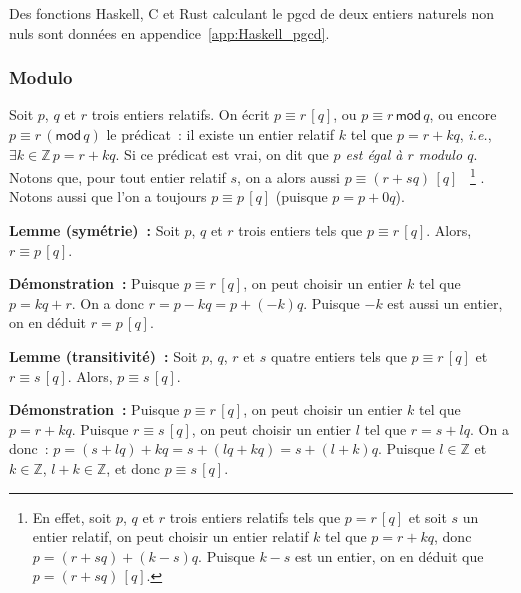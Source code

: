    \done 

\medskip

Des fonctions Haskell, C et Rust calculant le pgcd de deux entiers naturels non nuls sont données en appendice~\ref{app:Haskell_pgcd}. 

\subsubsection{Modulo}

Soit $p$, $q$ et $r$ trois entiers relatifs. 
On écrit $p \equiv r \, [q]$, ou $p \equiv r \, \mathsf{mod} \, q$, ou encore $p \equiv r \, ( \mathsf{mod} \, q)$ le prédicat : il existe un entier relatif $k$ tel que $p = r + k q$, \textit{i.e.}, $\exists k \in \mathbb{Z} \, p = r + k q$. 
Si ce prédicat est vrai, on dit que \textit{$p$ est égal à $r$ modulo $q$}.
Notons que, pour tout entier relatif $s$, on a alors aussi $p \equiv (r + s q) \, [q]$%
~\footnote{
    En effet, soit $p$, $q$ et $r$ trois entiers relatifs tels que $p = r \, [q]$ et soit $s$ un entier relatif, on peut choisir un entier relatif $k$ tel que $p = r + k q$, donc $p = (r + s q) + (k - s) q$. 
    Puisque $k-s$ est un entier, on en déduit que $p = (r + s q) \, [q]$.
}%
.
Notons aussi que l'on a toujours $p \equiv p \, [q]$ (puisque $p = p + 0 q$). 
 \sindex[isy]{$\%$}

\medskip 

\noindent\textbf{Lemme (symétrie) :} Soit $p$, $q$ et $r$ trois entiers tels que $p \equiv r \, [q]$.
    Alors, $r \equiv p \, [q]$.

\medskip 
    
\noindent\textbf{Démonstration :} 
    Puisque $p \equiv r \, [q]$, on peut choisir un entier $k$ tel que $p = k q + r$.
    On a donc $r = p - k q = p + (-k) q$. 
    Puisque $-k$ est aussi un entier, on en déduit $r = p \, [q]$.

\medskip 

\noindent\textbf{Lemme (transitivité) :} Soit $p$, $q$, $r$ et $s$ quatre entiers tels que $p \equiv r \, [q]$ et $r \equiv s \, [q]$.
    Alors, $p \equiv s \, [q]$.

\medskip 
    
\noindent\textbf{Démonstration :} 
    Puisque $p \equiv r \, [q]$, on peut choisir un entier $k$ tel que $p = r + k q$.
    Puisque $r \equiv s \, [q]$, on peut choisir un entier $l$ tel que $r = s + l q$.
    On a donc : $p = (s + l q) + k q = s + (l q + k q) = s + (l + k) q$.
    Puisque $l \in \mathbb{Z}$ et $k \in \mathbb{Z}$, $l + k \in \mathbb{Z}$, et donc $p \equiv s \, [q]$.

